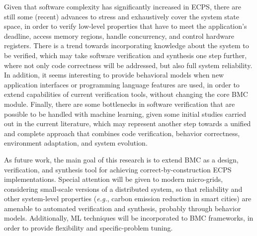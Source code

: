 \documentclass[format=acmsmall, review=false, screen=true]{acmart}
\begin{document}
{{Given that software complexity has significantly increased in ECPS, there are still some (recent) advances to stress and exhaustively cover the system state space, in order to verify low-level properties that have to meet the application's deadline, access memory regions, handle concurrency, and control hardware registers. There is a trend towards incorporating knowledge about the system to be verified, which may take software verification and synthesis one step further, where not only code correctness will be addressed, but also full system reliability. In addition, it seems interesting to provide behavioral models when new application interfaces or programming language features are used, in order to extend capabilities of current verification tools, without changing the core BMC module. Finally, there are some bottlenecks in software verification that are possible to be handled with machine learning, given some initial studies carried out in the current literature, which may represent another step towards a unified and complete approach that combines code verification, behavior correctness, environment adaptation, and system evolution.

As future work, the main goal of this research is to extend BMC as a design, verification, and synthesis tool for achieving correct-by-construction ECPS implementations. Special attention will be given to modern micro-grids, considering small-scale versions of a distributed system, so that reliability and other system-level properties ({\it e.g.}, carbon emission reduction in smart cities) are amenable to automated verification and synthesis, probably through behavior models. Additionally, ML techniques will be incorporated to BMC frameworks, in order to provide flexibility and specific-problem tuning.












}}
\end{document}
